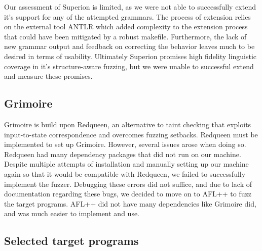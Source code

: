 \documentclass[12pt]{diazessay}
\begin{document}
Our assessment of Superion is limited, as we were not able to successfully extend it's support for any of the attempted grammars.
The process of extension relies on the external tool ANTLR which added complexity to the extension process that could have been mitigated by a robust makefile.
Furthermore, the lack of new grammar output and feedback on correcting the behavior leaves much to be desired in terms of usability.
Ultimately Superion promises high fidelity linguistic coverage in it's structure-aware fuzzing, but we were unable to successful extend and measure these promises.

\subsection*{Grimoire}

Grimoire is build upon Redqueen, an alternative to taint checking that exploits input-to-state correspondence and overcomes fuzzing setbacks. 
Redqueen must be implemented to set up Grimoire. However, several issues arose when doing so. Redqueen had many dependency packages that did not run on our machine. 
Despite multiple attempts of installation and manually setting up our machine again so that it would be compatible with Redqueen, we failed to successfully implement the fuzzer. Debugging these errors did not suffice, and due to lack of documentation regarding these bugs, we decided to move on to AFL++ to fuzz the target programs. 
AFL++ did not have many dependencies like Grimoire did, and was much easier to implement and use. 

\subsection*{Selected target programs}
\end{document}
